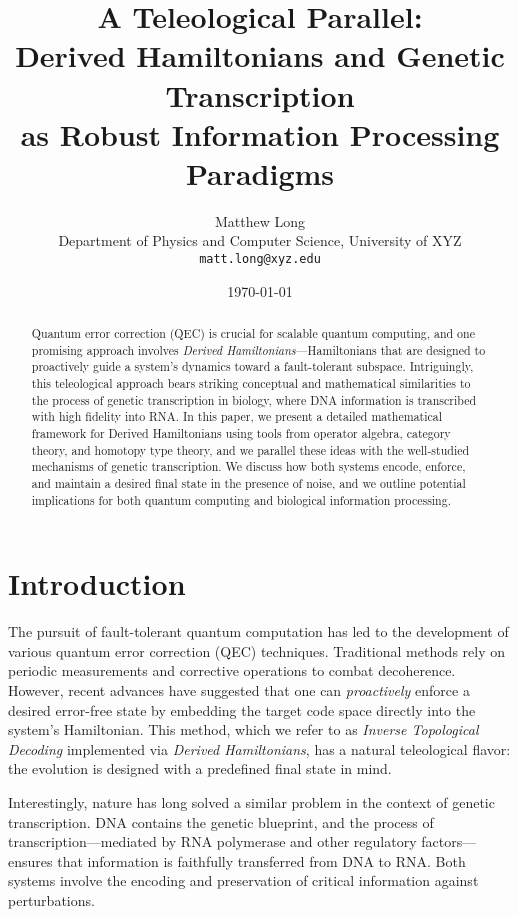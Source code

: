 \documentclass[11pt]{article}
\title{\textbf{A Teleological Parallel: \\ Derived Hamiltonians and Genetic Transcription \\ as Robust Information Processing Paradigms}}
\author{Matthew Long\\
Department of Physics and Computer Science, University of XYZ\\
\texttt{matt.long@xyz.edu}}
\date{\today}
\begin{document}
\maketitle

\begin{abstract}
Quantum error correction (QEC) is crucial for scalable quantum computing, and one promising approach involves \emph{Derived Hamiltonians}---Hamiltonians that are designed to proactively guide a system's dynamics toward a fault-tolerant subspace. Intriguingly, this teleological approach bears striking conceptual and mathematical similarities to the process of genetic transcription in biology, where DNA information is transcribed with high fidelity into RNA. In this paper, we present a detailed mathematical framework for Derived Hamiltonians using tools from operator algebra, category theory, and homotopy type theory, and we parallel these ideas with the well-studied mechanisms of genetic transcription. We discuss how both systems encode, enforce, and maintain a desired final state in the presence of noise, and we outline potential implications for both quantum computing and biological information processing.
\end{abstract}

\tableofcontents

\section{Introduction}
The pursuit of fault-tolerant quantum computation has led to the development of various quantum error correction (QEC) techniques. Traditional methods rely on periodic measurements and corrective operations to combat decoherence. However, recent advances have suggested that one can \emph{proactively} enforce a desired error-free state by embedding the target code space directly into the system's Hamiltonian. This method, which we refer to as \emph{Inverse Topological Decoding} implemented via \emph{Derived Hamiltonians}, has a natural teleological flavor: the evolution is designed with a predefined final state in mind.

Interestingly, nature has long solved a similar problem in the context of genetic transcription. DNA contains the genetic blueprint, and the process of transcription—mediated by RNA polymerase and other regulatory factors—ensures that information is faithfully transferred from DNA to RNA. Both systems involve the encoding and preservation of critical information against perturbations.
\end{document}
